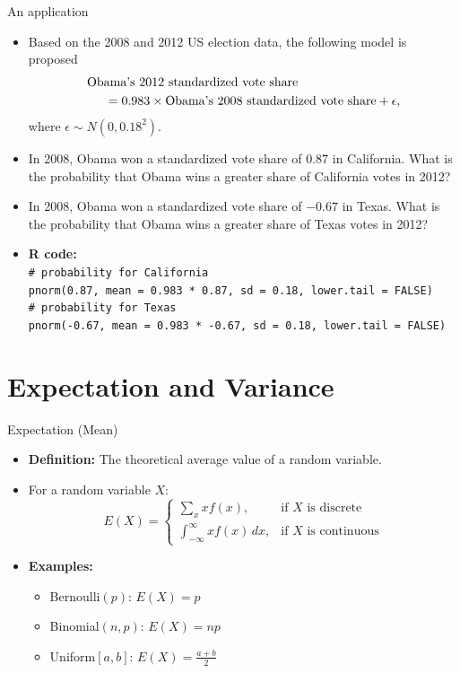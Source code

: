 \documentclass[aspectratio=169]{beamer}
\begin{document}
\begin{frame}{An application}

    \begin{itemize}
        \item Based on the 2008 and 2012 US election data, the following model is proposed
        \begin{align*}
            &\text{Obama’s 2012 standardized vote share} \\
            &\hspace{0.5cm} = 0.983 \times \text{Obama’s 2008 standardized vote share} + \epsilon, 
        \end{align*}        
        where $\epsilon\sim N(0, 0.18^2)$.
        \item In 2008, Obama won a standardized vote share of $0.87$ in California. What is the probability that Obama wins a greater share of California votes in 2012?
        \item In 2008, Obama won a standardized vote share of $-0.67$ in Texas. What is the probability that Obama wins a greater share of Texas votes in 2012?
        \item \textbf{R code:}
        \texttt{\\
            \# probability for California \\
            pnorm(0.87, mean = 0.983 * 0.87, sd = 0.18, lower.tail = FALSE) \\
            \# probability for Texas \\
            pnorm(-0.67, mean = 0.983 * -0.67, sd = 0.18, lower.tail = FALSE)
        }
    \end{itemize}
\end{frame}

\section{\large Expectation and Variance}

\begin{frame}{Expectation (Mean)}
    \begin{itemize}
        \item \textbf{Definition:} The theoretical average value of a random variable.
        \item For a random variable \(X\):
        \[
        E(X) =
        \begin{cases}
        \sum_x x f(x), & \text{if } X \text{ is discrete} \\
        \int_{-\infty}^\infty x f(x) \, dx, & \text{if } X \text{ is continuous}
        \end{cases}
        \]
        \item \textbf{Examples:}
        \begin{itemize}
            \item[$\bullet$] Bernoulli$(p)$: \(E(X) = p\)
            \item[$\bullet$] Binomial$(n, p)$: \(E(X) = np\)
            \item[$\bullet$] Uniform$[a, b]$: \(E(X) = \frac{a + b}{2}\)
        \end{itemize}
    \end{itemize}
\end{frame}
\end{document}
